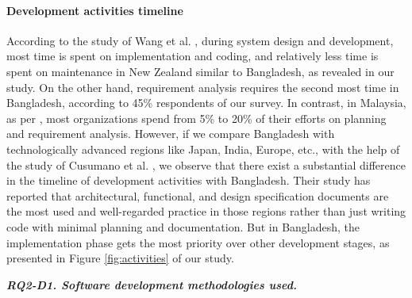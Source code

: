 \paragraph{Development activities timeline}
According to the study of Wang et al. \citep{Wang2018}, during system design and development, most time is spent on implementation and coding, and relatively less time is spent on maintenance in New Zealand similar to Bangladesh, as revealed in our study. On the other hand, requirement analysis requires the second most time in Bangladesh, according to 45\% respondents of our survey. In contrast, in Malaysia, as per \citep{Baharom2006}, most organizations spend from 5\% to 20\% of their efforts on planning and requirement analysis. However, if we compare Bangladesh with technologically advanced regions like Japan, India, Europe, etc., with the help of the study of Cusumano et al. \citep{Cusumano2003}, we observe that there exist a substantial difference in the timeline of development activities with Bangladesh. Their study has reported that architectural, functional, and design specification documents are the most used and well-regarded practice in those regions rather than just writing code with minimal planning and documentation. But in Bangladesh, the implementation phase gets the most priority over other development stages, as presented in Figure \ref{fig:activities} of our study.

\begin{tcolorbox}[flushleft upper,boxrule=1pt,arc=0pt,left=0pt,right=0pt,top=0pt,bottom=0pt,colback=white,after=\ignorespacesafterend\par\noindent]
\nd\it{\bf{RQ2-D1. Software development methodologies used.}} 
\end{tcolorbox}
